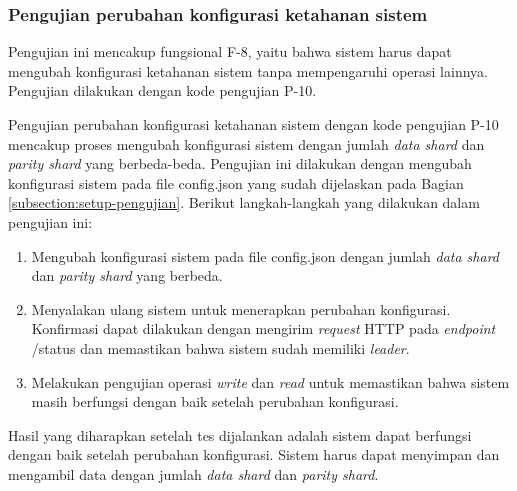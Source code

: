 \subsubsection{Pengujian perubahan konfigurasi ketahanan sistem}
\label{subsubsection:pengujian-perubahan-konfigurasi-ketahanan}

Pengujian ini mencakup fungsional F-8, yaitu bahwa sistem harus dapat mengubah konfigurasi ketahanan sistem tanpa mempengaruhi operasi lainnya. Pengujian dilakukan dengan kode pengujian P-10.

Pengujian perubahan konfigurasi ketahanan sistem dengan kode pengujian P-10 mencakup proses mengubah konfigurasi sistem dengan jumlah \textit{data shard} dan \textit{parity shard} yang berbeda-beda. Pengujian ini dilakukan dengan mengubah konfigurasi sistem pada file config.json yang sudah dijelaskan pada Bagian \ref{subsection:setup-pengujian}. Berikut langkah-langkah yang dilakukan dalam pengujian ini:

\begin{enumerate}
  \item Mengubah konfigurasi sistem pada file config.json dengan jumlah \textit{data shard} dan \textit{parity shard} yang berbeda.
  \item Menyalakan ulang sistem untuk menerapkan perubahan konfigurasi. Konfirmasi dapat dilakukan dengan mengirim \textit{request} HTTP pada \textit{endpoint} /status dan memastikan bahwa sistem sudah memiliki \textit{leader}.
  \item Melakukan pengujian operasi \textit{write} dan \textit{read} untuk memastikan bahwa sistem masih berfungsi dengan baik setelah perubahan konfigurasi.
\end{enumerate}

Hasil yang diharapkan setelah tes dijalankan adalah sistem dapat berfungsi dengan baik setelah perubahan konfigurasi. Sistem harus dapat menyimpan dan mengambil data dengan jumlah \textit{data shard} dan \textit{parity shard}.